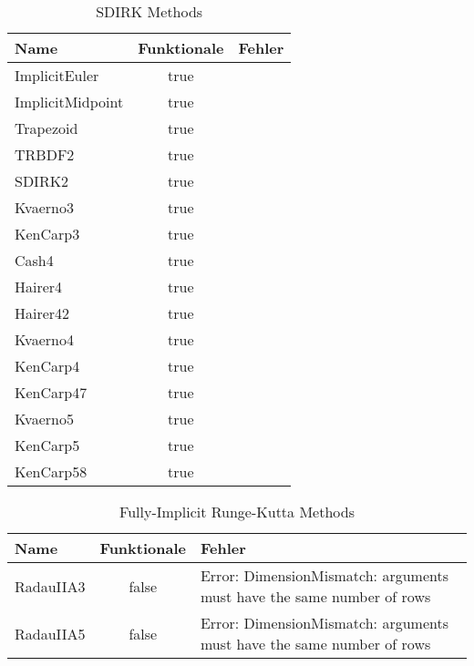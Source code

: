 \begin{table}[]
    \centering
    
    \begin{tabular}{p{5cm}|c|p{5cm}}
        Name             & Funktionale & Fehler \\
        \hline\hline        
        ImplicitEuler    & true        & \\ 
        ImplicitMidpoint & true        & \\ 
        Trapezoid        & true        & \\ 
        TRBDF2           & true        & \\ 
        SDIRK2           & true        & \\ 
        Kvaerno3         & true        & \\ 
        KenCarp3         & true        & \\ 
        Cash4            & true        & \\ 
        Hairer4          & true        & \\ 
        Hairer42         & true        & \\ 
        Kvaerno4         & true        & \\ 
        KenCarp4         & true        & \\ 
        KenCarp47        & true        & \\ 
        Kvaerno5         & true        & \\ 
        KenCarp5         & true        & \\ 
        KenCarp58        & true        & \\       
    \end{tabular}
    \caption{SDIRK Methods}
    \label{tab:my_label}
\end{table}

\begin{table}[]
    \centering

    \begin{tabular}{p{5cm}|c|p{5cm}}
        Name & Funktionale & Fehler \\
        \hline\hline
        RadauIIA3 & false & Error: DimensionMismatch: arguments must have the same number of rows \\
        RadauIIA5 & false & Error: DimensionMismatch: arguments must have the same number of rows \\
    \end{tabular}
    \caption{Fully-Implicit Runge-Kutta Methods}
    \label{tab:my_label}
\end{table}

